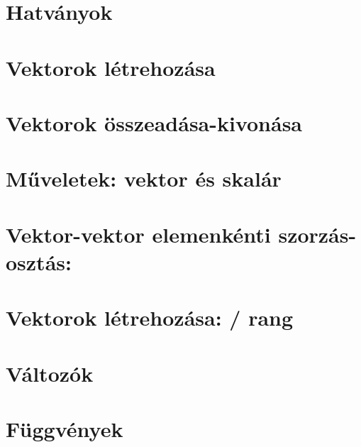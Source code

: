 \begin{spacing}{1.2}
\section*{Hatványok} \label{DBmatlabia5Mo}
\Mo{

}
\vspace{0.5cm}
\newpage
\section*{Vektorok létrehozása} \label{DBmatlabia6}
\Desc{

}
\vspace{0.5cm}
\newpage
\section*{Vektorok összeadása-kivonása} \label{DBmatlabia6s}
\Desc{

}
\vspace{0.5cm}
\newpage
\section*{Műveletek: vektor és skalár} \label{DBmatlabia7}
\Desc{

}
\vspace{0.5cm}
\newpage
\section*{Vektor-vektor elemenkénti szorzás-osztás: } \label{DBmatlabia8}
\Desc{

}
\vspace{0.5cm}
\newpage
\section*{Vektorok létrehozása: \mcode{:} / rang} \label{DBmatlabia9}
\Desc{

}
\vspace{0.5cm}
\newpage
\section*{Változók} \label{DBmatlabia10}
\Desc{

}
\vspace{0.5cm}
\newpage
\section*{Függvények} \label{DBmatlabia11}
\Desc{

}
\vspace{0.5cm}
\newpage

\end{spacing}


